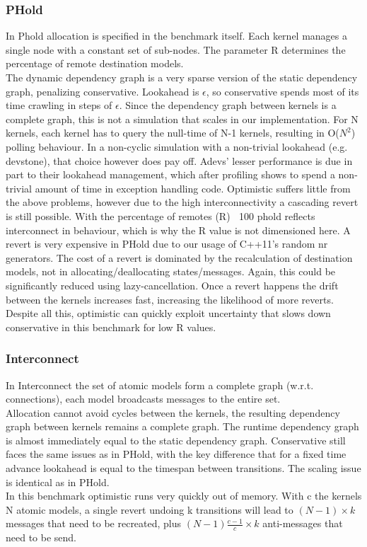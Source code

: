 \subsubsection{PHold}
In Phold allocation is specified in the benchmark itself. Each kernel manages a single node with a constant set of sub-nodes. The parameter R determines the percentage of remote destination models.\\
The dynamic dependency graph is a very sparse version of the static dependency graph, penalizing conservative. Lookahead is $\epsilon$, so conservative spends most of its time crawling in steps of $\epsilon$. Since the dependency graph between kernels is a complete graph, this is not a simulation that scales in our implementation. For N kernels, each kernel has to query the null-time of N-1 kernels, resulting in O($N^2$) polling behaviour. In a non-cyclic simulation with a non-trivial lookahead (e.g. devstone), that choice however does pay off. Adevs' lesser performance is due in part to their lookahead management, which after profiling shows to spend a non-trivial amount of time in exception handling code. 
Optimistic suffers little from the above problems, however due to the high interconnectivity a cascading revert is still possible. With the percentage of remotes (R) $~$ 100 phold reflects interconnect in behaviour, which is why the R value is not dimensioned here. A revert is very expensive in PHold due to our usage of C++11's random nr generators. The cost of a revert is dominated by the recalculation of destination models, not in allocating/deallocating states/messages. Again, this could be significantly reduced using lazy-cancellation. Once a revert happens the drift between the kernels increases fast, increasing the likelihood of more reverts. Despite all this, optimistic can quickly exploit uncertainty that slows down conservative in this benchmark for low R values.
\subsubsection{Interconnect}
In Interconnect
the set of atomic models form a complete graph (w.r.t. connections), each model broadcasts messages to the entire set. \\
Allocation cannot avoid cycles between the kernels, the resulting dependency graph between kernels remains a complete graph. The runtime dependency graph is almost immediately equal to the static dependency graph.
Conservative still faces the same issues as in PHold, with the key difference that for a fixed time advance lookahead is equal to the timespan between transitions. The scaling issue is identical as in PHold.\\
In this benchmark optimistic runs very quickly out of memory. With c the kernels N atomic models, a single revert undoing k transitions will lead to $(N-1)\times k$ messages that need to be recreated, plus $(N-1) \frac{c-1}{c} \times k$ anti-messages that need to be send.

